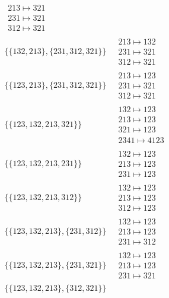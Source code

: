 \begin{scriptsize}
\begin{align}
\begin{matrix}
213 \mapsto 321\\231 \mapsto 321\\312 \mapsto 321
\end{matrix}
\\
\{\{132, 213\}, \{231, 312, 321\}\}
\ 
&
\begin{matrix}
213 \mapsto 132\\231 \mapsto 321\\312 \mapsto 321
\end{matrix}
\\
\{\{123, 213\}, \{231, 312, 321\}\}
\ 
&
\begin{matrix}
213 \mapsto 123\\231 \mapsto 321\\312 \mapsto 321
\end{matrix}
\\
\{\{123, 132, 213, 321\}\}
\ 
&
\begin{matrix}
132 \mapsto 123\\213 \mapsto 123\\321 \mapsto 123\\2341 \mapsto 4123
\end{matrix}
\\
\{\{123, 132, 213, 231\}\}
\ 
&
\begin{matrix}
132 \mapsto 123\\213 \mapsto 123\\231 \mapsto 123
\end{matrix}
\\
\{\{123, 132, 213, 312\}\}
\ 
&
\begin{matrix}
132 \mapsto 123\\213 \mapsto 123\\312 \mapsto 123
\end{matrix}
\\
\{\{123, 132, 213\}, \{231, 312\}\}
\ 
&
\begin{matrix}
132 \mapsto 123\\213 \mapsto 123\\231 \mapsto 312
\end{matrix}
\\
\{\{123, 132, 213\}, \{231, 321\}\}
\ 
&
\begin{matrix}
132 \mapsto 123\\213 \mapsto 123\\231 \mapsto 321
\end{matrix}
\\
\{\{123, 132, 213\}, \{312, 321\}\}
\ 
&
\begin{matrix}

\end{matrix}
\end{align}
\end{scriptsize}
